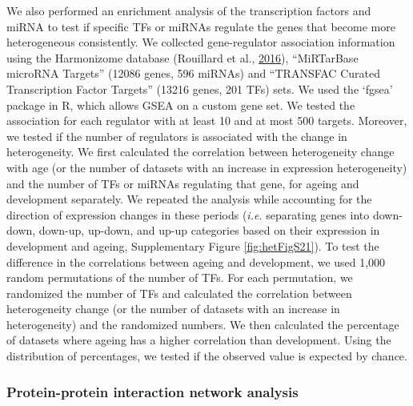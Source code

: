 \documentclass[12pt,twoside]{unicam}
\begin{document}
We also performed an enrichment analysis of the transcription factors and miRNA to test if specific TFs or miRNAs regulate the genes that become more heterogeneous consistently. We collected gene-regulator association information using the Harmonizome database (Rouillard et al., \protect\hyperlink{ref-Rouillard2016}{2016}), ``MiRTarBase microRNA Targets'' (12086 genes, 596 miRNAs) and ``TRANSFAC Curated Transcription Factor Targets'' (13216 genes, 201 TFs) sets. We used the `fgsea' package in R, which allows GSEA on a custom gene set. We tested the association for each regulator with at least 10 and at most 500 targets. Moreover, we tested if the number of regulators is associated with the change in heterogeneity. We first calculated the correlation between heterogeneity change with age (or the number of datasets with an increase in expression heterogeneity) and the number of TFs or miRNAs regulating that gene, for ageing and development separately. We repeated the analysis while accounting for the direction of expression changes in these periods (\emph{i.e.} separating genes into down-down, down-up, up-down, and up-up categories based on their expression in development and ageing, Supplementary Figure \ref{fig:hetFigS21}). To test the difference in the correlations between ageing and development, we used 1,000 random permutations of the number of TFs. For each permutation, we randomized the number of TFs and calculated the correlation between heterogeneity change (or the number of datasets with an increase in heterogeneity) and the randomized numbers. We then calculated the percentage of datasets where ageing has a higher correlation than development. Using the distribution of percentages, we tested if the observed value is expected by chance.

\hypertarget{protein-protein-interaction-network-analysis}{%
\subsubsection{Protein-protein interaction network analysis}\label{protein-protein-interaction-network-analysis}}
\end{document}
